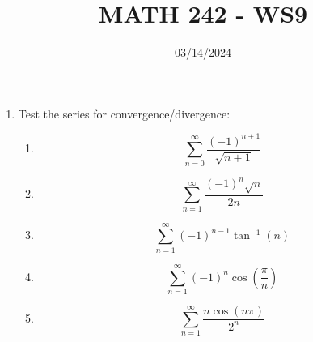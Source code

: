 \documentclass[12pt]{article}
\title{MATH 242 - WS9}
\date{03/14/2024}
\begin{document}
\maketitle


\begin{enumerate}

\item Test the series for convergence/divergence:
\begin{enumerate}
    \item $$\sum_{n=0}^{\infty}\frac{(-1)^{n+1}}{\sqrt{n+1}}$$
    \newpage
    \item $$\sum_{n=1}^{\infty}\frac{(-1)^{n}\sqrt{n}}{2n}$$
    \vfill
    \item $$\sum_{n=1}^{\infty}(-1)^{n-1}\tan^{-1}(n)$$
    \vfill
    \newpage
    \item $$\sum_{n=1}^{\infty}(-1)^{n}\cos\left(\frac{\pi}{n}\right)$$
    \vfill
    \item $$\sum_{n=1}^{\infty}\frac{n\cos(n\pi)}{2^n}$$
    \vfill
    \newpage
\end{enumerate}

\end{enumerate}
\end{document}
